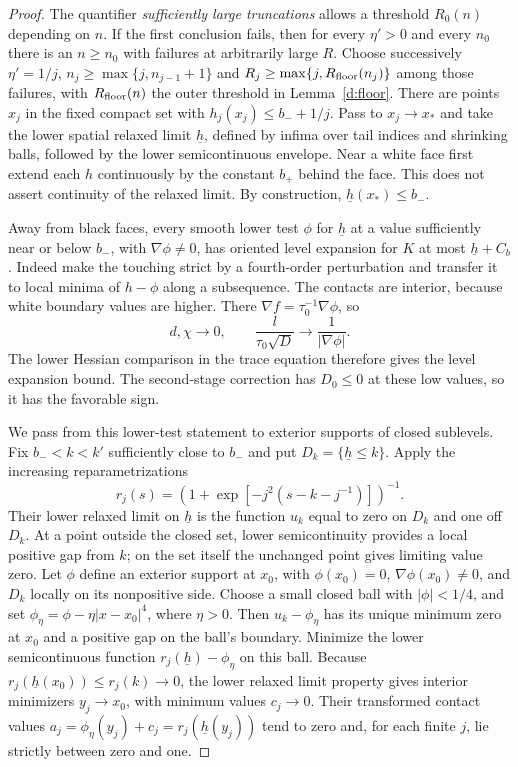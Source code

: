 \begin{proof}
The quantifier \emph{sufficiently large truncations} allows a
threshold $R_0(n)$ depending on $n$.  If the first conclusion fails,
then for every $\eta'>0$ and every $n_0$ there is an $n\ge n_0$ with
failures at arbitrarily large $R$.  Choose successively $\eta'=1/j$,
$n_j\ge\max\{j,n_{j-1}+1\}$ and
$R_j\ge\max\{j,R_{\rm floor}(n_j)\}$ among those failures, with
$R_{\rm floor}(n)$ the outer threshold in Lemma~\ref{d:floor}.
There are points $x_j$ in the fixed compact set with
$h_j(x_j)\le b_-+1/j$.  Pass to $x_j\to x_*$ and take the lower
spatial relaxed limit
$\underline h$, defined by infima over tail indices and shrinking
balls, followed by the lower semicontinuous envelope.  Near a white
face first extend each $h$ continuously by the constant $b_+$ behind
the face.  This does not assert continuity of the relaxed limit.
By construction, $\underline h(x_*)\le b_-$.

Away from black faces, every smooth lower test $\phi$ for
$\underline h$ at a value sufficiently near or below $b_-$, with
$\nabla\phi\ne0$, has oriented level expansion for $K$ at most
$\underline h+C_b$.  Indeed make the touching strict by a
fourth-order perturbation and transfer it to local minima of
$h-\phi$ along a subsequence.  The contacts are interior, because
white boundary values are higher.  There
$\nabla f=\tau_0^{-1}\nabla\phi$, so
\[
 d,\chi\longrightarrow0,\qquad
 \frac{l}{\tau_0\sqrt D}\longrightarrow\frac1{|\nabla\phi|}.
\]
The lower Hessian comparison in the trace equation therefore gives
the level expansion bound.  The second-stage correction has
$D_0\le0$ at these low values, so it has the favorable sign.

We pass from this lower-test statement to exterior supports of
closed sublevels.  Fix $b_-<k<k'$ sufficiently close to $b_-$ and
put $D_k=\{\underline h\le k\}$.  Apply the increasing
reparametrizations
\[
 r_j(s)=\left(1+\exp[-j^2(s-k-j^{-1})]\right)^{-1}.
\]
Their lower relaxed limit on $\underline h$ is the function $u_k$
equal to zero on $D_k$ and one off $D_k$.  At a point outside the
closed set, lower semicontinuity provides a local positive gap from
$k$; on the set itself the unchanged point gives limiting value zero.
Let $\phi$ define an exterior support at $x_0$, with $\phi(x_0)=0$,
$\nabla\phi(x_0)\ne0$, and $D_k$ locally on its nonpositive side.
Choose a small closed ball with $|\phi|<1/4$, and set
$\phi_\eta=\phi-\eta|x-x_0|^4$, where $\eta>0$.
Then $u_k-\phi_\eta$ has its unique minimum zero at $x_0$ and a
positive gap on the ball's boundary.  Minimize the lower
semicontinuous function $r_j(\underline h)-\phi_\eta$ on this ball.
Because $r_j(\underline h(x_0))\le r_j(k)\to0$, the lower relaxed
limit property gives interior minimizers $y_j\to x_0$, with
minimum values $c_j\to0$.  Their transformed contact values
$a_j=\phi_\eta(y_j)+c_j=r_j(\underline h(y_j))$ tend to zero and,
for each finite $j$, lie strictly between zero and one.


\end{proof}
